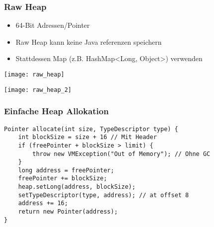 \subsubsection{Raw Heap}
\begin{itemize}[topsep=0pt]
    \itemsep -0.2em
    \item 64-Bit Adressen/Pointer
    \item Raw Heap kann keine Java referenzen speichern
    \item Stattdessen Map (z.B. HashMap<Long, Object>) verwenden
\end{itemize}
\begin{minipage}{0.5\linewidth}
    \texttt{[image: raw\_heap]}
\end{minipage}
\begin{minipage}{0.5\linewidth}
    \texttt{[image: raw\_heap\_2]}
\end{minipage}

\subsubsection{Einfache Heap Allokation}
\begin{lstlisting}
Pointer allocate(int size, TypeDescriptor type) {
    int blockSize = size + 16 // Mit Header
    if (freePointer + blockSize > limit) {
        throw new VMException("Out of Memory"); // Ohne GC
    }
    long address = freePointer;
    freePointer += blockSize;
    heap.setLong(address, blockSize);
    setTypeDescriptor(type, address); // at offset 8
    address += 16;
    return new Pointer(address);
}
\end{lstlisting}